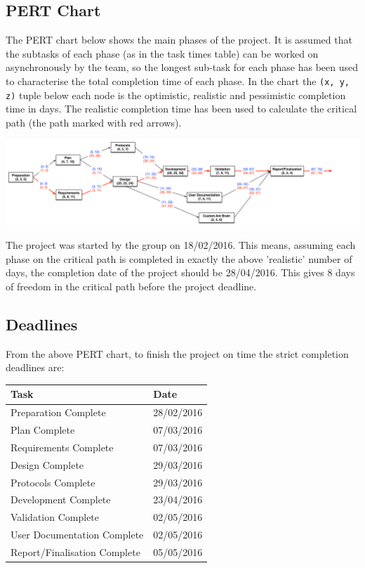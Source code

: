 \documentclass[11pt]{article}
\begin{document}
\subsection{PERT Chart}

The PERT chart below shows the main phases of the project. It is assumed that the subtasks of each phase (as in the task times table) can be worked on asynchronously by the team, so the longest sub-task for each phase has been used to characterise the total completion time of each phase. In the chart the \texttt{(x, y, z)} tuple below each node is the optimistic, realistic and pessimistic completion time in days. The realistic completion time has been used to calculate the critical path (the path marked with red arrows).

\begin{center}
\includegraphics[width=\linewidth]{resources/pert}
\end{center}


The project was started by the group on 18/02/2016. This means, assuming each phase on the critical path is completed in exactly the above 'realistic' number of days, the completion date of the project should be 28/04/2016. This gives 8 days of freedom in the critical path before the project deadline.

\subsection{Deadlines}

From the above PERT chart, to finish the project on time the strict completion deadlines are:

\begin{center}
\begin{tabular}{|l|l|}
\hline
\textbf{Task} & \textbf{Date} \\ \hline
Preparation Complete & 28/02/2016 \\ \hline
Plan Complete & 07/03/2016 \\ \hline
Requirements Complete & 07/03/2016 \\ \hline
Design Complete & 29/03/2016 \\ \hline
Protocols Complete & 29/03/2016 \\ \hline
Development Complete & 23/04/2016 \\ \hline
Validation Complete & 02/05/2016 \\ \hline
User Documentation Complete & 02/05/2016 \\ \hline
Report/Finalisation Complete & 05/05/2016 \\ \hline
\end{tabular}
\end{center}
\end{document}
